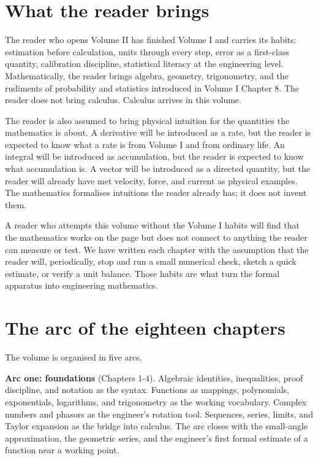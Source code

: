 \section*{What the reader brings}

The reader who opens Volume II has finished Volume I and carries its habits: estimation before calculation, units through every step, error as a first-class quantity, calibration discipline, statistical literacy at the engineering level. Mathematically, the reader brings algebra, geometry, trigonometry, and the rudiments of probability and statistics introduced in Volume I Chapter 8. The reader does not bring calculus. Calculus arrives in this volume.

The reader is also assumed to bring physical intuition for the quantities the mathematics is about. A derivative will be introduced as a rate, but the reader is expected to know what a rate is from Volume I and from ordinary life. An integral will be introduced as accumulation, but the reader is expected to know what accumulation is. A vector will be introduced as a directed quantity, but the reader will already have met velocity, force, and current as physical examples. The mathematics formalises intuitions the reader already has; it does not invent them.

A reader who attempts this volume without the Volume I habits will find that the mathematics works on the page but does not connect to anything the reader can measure or test. We have written each chapter with the assumption that the reader will, periodically, stop and run a small numerical check, sketch a quick estimate, or verify a unit balance. Those habits are what turn the formal apparatus into engineering mathematics.

\section*{The arc of the eighteen chapters}

The volume is organised in five arcs.

\textbf{Arc one: foundations} (Chapters 1-4). Algebraic identities, inequalities, proof discipline, and notation as the syntax. Functions as mappings, polynomials, exponentials, logarithms, and trigonometry as the working vocabulary. Complex numbers and phasors as the engineer's rotation tool. Sequences, series, limits, and Taylor expansion as the bridge into calculus. The arc closes with the small-angle approximation, the geometric series, and the engineer's first formal estimate of a function near a working point.

